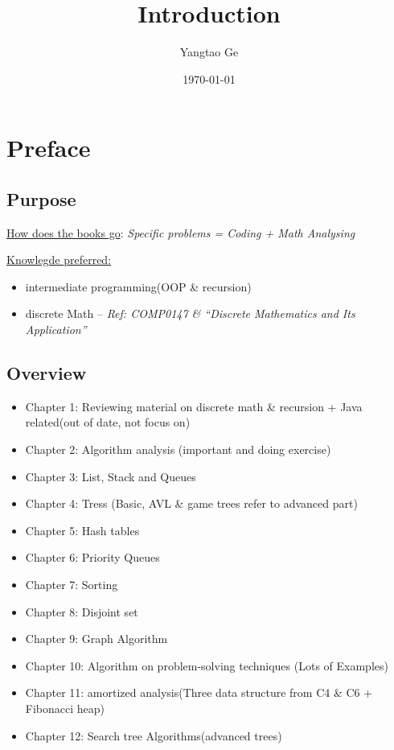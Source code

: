 \documentclass[12pt]{article}
\title{Introduction}
\author{Yangtao Ge}
\date{\today}
\begin{document}
\maketitle

\section{Preface}
\subsection{Purpose}
\underline{How does the books go}: \newline
\textit{Specific problems = Coding + Math Analysing}

\underline{Knowlegde preferred:}
\begin{itemize}
    \item intermediate programming(OOP \& recursion)
    \item discrete Math -- \emph{Ref: COMP0147 \& ``Discrete Mathematics and Its Application''}
\end{itemize}

\subsection{Overview}
\begin{itemize}
    \item Chapter 1: Reviewing material on discrete math \& recursion + Java related(out of date, not focus on)
    \item Chapter 2: Algorithm analysis (important and doing exercise)
    \item Chapter 3: List, Stack and Queues
    \item Chapter 4: Tress (Basic, AVL \& game trees refer to advanced part)
    \item Chapter 5: Hash tables 
    \item Chapter 6: Priority Queues
    \item Chapter 7: Sorting
    \item Chapter 8: Disjoint set
    \item Chapter 9: Graph Algorithm
\end{itemize}

\begin{itemize}
    \item Chapter 10: Algorithm on problem-solving techniques (Lots of Examples)
    \item Chapter 11: amortized analysis(Three data structure from C4 \& C6 + Fibonacci heap)
    \item Chapter 12: Search tree Algorithms(advanced trees)
\end{itemize}
\end{document}
